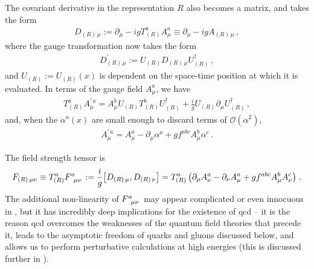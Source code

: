 The covariant derivative in the representation \(R\) also becomes a matrix, and takes the form
\begin{align}
    D_{(R)\,\mu}
    :=
    \partial_\mu
    -
    i g T^a_{(R)} A^a_\mu
    \equiv
    \partial_\mu
    -
    i g A_{(R)\,\mu}
    \,,
\end{align}
where the gauge transformation now takes the form
\begin{align}
    D^\prime_{(R)\,\mu}
    :=
    U_{(R)}
    D_{(R)\,\mu}
    U^\dagger_{(R)}
    \,,
\end{align}
and \(U_{(R)} := U_{(R)}(x)\) is dependent on the space-time position at which it is evaluated.
%
In terms of the gauge field \(A^a_\mu\), we have
\begin{align}
    T^a_{(R)} A^{\prime\,a}_\mu
    =
    A_\mu^b
    U_{(R)} T^b_{(R)} U^\dagger_{(R)}
    +
    \frac{i}{g} U_{(R)} \partial_\mu U^\dagger_{(R)}
    \,,
\end{align}
and, when the \(\alpha^a(x)\) are small enough to discard terms of \(\mathcal{O}(\alpha^2)\),
\begin{align}
    A^{\prime\,a}_\mu
    =
    A^{a}_\mu
    -
    \partial_\mu \alpha^a
    +
    g f^{abc} A^b_\mu \alpha^c
    \,.
\end{align}

The field strength tensor is
\begin{align}
    \label{eq:non-abelian-field-strength}
    F_{(R)\,\mu\nu}
    \equiv
    T^a_{(R)}
    F\indices{^a_{\mu\nu}}
    :=
    \frac{i}{g}
    \comm{D_{(R)\,\mu}}{D_{(R)\,\nu}}
    =
    T^a_{(R)}
    \le(
        \partial_\mu A^a_\nu - \partial_\nu A^a_\mu
        + g f^{abc} A^b_\mu A^c_\nu
    \ri)
    \,.
\end{align}
The additional non-linearity of \(F\indices{^a_{\mu\nu}}\) may appear complicated or even innocuous in , but it has incredibly deep implications for the existence of \gls{qcd} -- it is the reason \gls{qcd} overcomes the weaknesses of the quantum field theories that precede it, leads to the asymptotic freedom of quarks and gluons discussed below, and allows us to perform perturbative calculations at high energies (this is discussed further in ).



